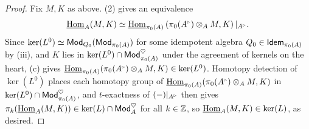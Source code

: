 \begin{proof}
    Fix $M, K$ as above.  (2) gives an equivalence 
    $$\intHom_{A}(M, K)\simeq\intHom_{\pi_{0}(A)}\left(\pi_{0}(A^{\tri})\otimes_{A}M, K\right)|_{A^{\tri}}.$$
    Since $\ker(L^{0})\simeq\mathsf{Mod}_{Q_{0}}(\mathsf{Mod}_{\pi_{0}(A)})$ for some idempotent algebra $Q_{0}\in\mathsf{Idem}_{\pi_{0}(A)}$ by (iii), and $K$ lies in $\ker(L^{0})\cap\mathsf{Mod}_{\pi_{0}(A)}^{\heartsuit}$ under the agreement of kernels on the heart,  (c) gives $\intHom_{\pi_{0}(A)}(\pi_{0}(A^{\tri})\otimes_{A}M, K)\in\ker(L^{0})$. Homotopy detection of $\ker(L^{0})$ places each homotopy group of $\intHom_{\pi_{0}(A)}(\pi_{0}(A^{\tri})\otimes_{A}M, K)$ in $\ker(L^{0})\cap\mathsf{Mod}_{\pi_{0}(A)}^{\heartsuit}$, and $t$-exactness of $(-)|_{A^{\tri}}$ then gives $\pi_{k}(\underline{\mathrm{Hom}}_{A}(M, K))\in\ker(L)\cap\mathsf{Mod}_{A}^{\heartsuit}$ for all $k\in\mathbb{Z}$, so $\underline{\mathrm{Hom}}_{A}(M, K)\in\ker(L)$, as desired. 
\end{proof}
